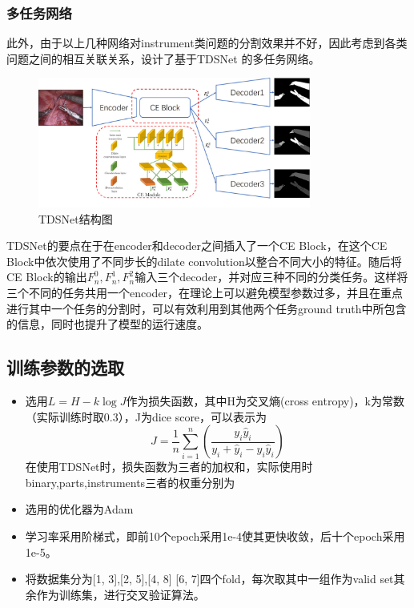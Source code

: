\documentclass[UTF8]{ctexart}
\begin{document}
\subsubsection{多任务网络}
此外，由于以上几种网络对instrument类问题的分割效果并不好，因此考虑到各类问题之间的相互关联关系，设计了基于TDSNet%
的多任务网络。

\begin{figure}[H]
    \centering  %
    \includegraphics[width=0.8\textwidth]{figure/TDSNet.jpg}
    \caption{TDSNet结构图}
\end{figure}
TDSNet的要点在于在encoder和decoder之间插入了一个CE Block，在这个CE Block中依次使用了不同步长的dilate convolution以整合不同大小的特征。随后将CE Block的输出$F_n^0,F_n^1,F_n^2$输入三个decoder，并对应三种不同的分类任务。这样将三个不同的任务共用一个encoder，在理论上可以避免模型参数过多，并且在重点进行其中一个任务的分割时，可以有效利用到其他两个任务ground truth中所包含的信息，同时也提升了模型的运行速度。

\subsection{训练参数的选取}
\begin{itemize}
    \item 选用$L=H-k\log J$作为损失函数，其中H为交叉熵(cross entropy)，k为常数（实际训练时取0.3），J为dice score，可以表示为
    $$J=\frac{1}{n}\sum_{i=1}^n(\frac{y_i\hat{y}_i}{y_i+\hat{y}_i-y_i\hat{y}_i})$$
    在使用TDSNet时，损失函数为三者的加权和，实际使用时binary,parts,instruments三者的权重分别为%
    \item 选用的优化器为Adam
    \item 学习率采用阶梯式，即前10个epoch采用1e-4使其更快收敛，后十个epoch采用1e-5。
    \item 将数据集分为[1, 3],[2, 5],[4, 8] [6, 7]四个fold，每次取其中一组作为valid set其余作为训练集，进行交叉验证算法。
\end{itemize}
\end{document}
